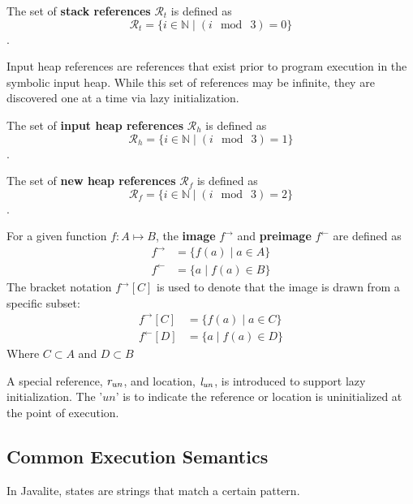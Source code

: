 \begin{definition}
The set of \textbf{stack references} $\mathcal{R}_t$ is defined as
 $$\mathcal{R}_t =\{i \in \mathbb{N} \mid ( i\ \bmod\ 3 ) = 0\}$$. 
\end{definition}

Input heap references are references that exist prior to program execution in the symbolic input heap. While this set of references may be infinite, they are discovered one at a time via lazy initialization.

\begin{definition}
The set of \textbf{input heap references} $\mathcal{R}_h$ is defined as
 $$\mathcal{R}_h =\{i \in \mathbb{N} \mid ( i\ \bmod\ 3 ) = 1\}$$. 
\end{definition}

\begin{definition}
The set of \textbf{new heap references} $\mathcal{R}_f$ is defined as
 $$\mathcal{R}_f =\{i \in \mathbb{N} \mid ( i\ \bmod\ 3 ) = 2\}$$. 
\end{definition}

\begin{definition}
For a given function $f:A \mapsto B$, the \textbf{image} $f^\rightarrow$ and \textbf{preimage} $f^\leftarrow$ are defined as
\begin{align}
 f^\rightarrow &= \{ f(a) \mid a \in A\}\\
 f^\leftarrow &= \{ a \mid f(a) \in B \}
 \end{align}
 The bracket notation $ f^\rightarrow [C] $ is used to denote that the image is drawn from a specific subset:
 \begin{align}
 f^\rightarrow [C] &= \{ f(a) \mid a \in C\}\\
 f^\leftarrow [D] &= \{ a \mid f(a) \in D \}
 \end{align}
 Where $C \subset A$ and $D \subset B$
\end{definition}

A special reference, $\emph{r}_\mathit{un}$, and location,
$\emph{l}_\mathit{un}$, is introduced to support lazy
initialization. The '$\mathit{un}$' is to indicate the reference or
location is uninitialized at the point of execution.

\subsection{Common Execution Semantics}

In Javalite, states are strings that match a certain pattern. 

